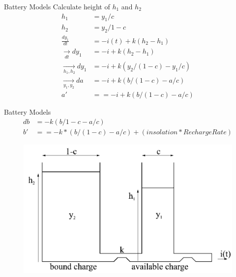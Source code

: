\begin{frame}[fragile]{Battery Models}{\insertsubsection}
	Calculate height of $h_1$ and $h_2$
	\begin{equation*}
	\begin{aligned}
		h_1 &= y_1/c\\
		h_2 &= y_2/1-c\\
		\frac{dy_1}{dt} &= -i(t)+k(h_2-h_1)\\
		\xrightarrow[dt]{} dy_1 &= -i+k(h_2-h_1) \\
		\xrightarrow[h_1, h_2]{} dy_1 &= -i+k(y_2/(1-c)-y_1/c)\\
		\xrightarrow[y_1, y_2]{} da &= -i+k(b/(1-c)-a/c)\\
		a '&== -i+k(b/(1-c)-a/c)
	\end{aligned}
	\end{equation*}
\end{frame}

\begin{frame}[fragile]{Battery Models}{\insertsubsection}
	\begin{equation*}
	\begin{aligned}
		db &= -k(b/1-c-a/c)\\
		b '&== -k*(b/(1-c)-a/c)+(insolation*RechargeRate)
	\end{aligned}
	\end{equation*}
	\begin{figure}[h]
		\includegraphics[width=.7\textwidth]{graphics/kibam_wells}
	\end{figure}
\end{frame}

